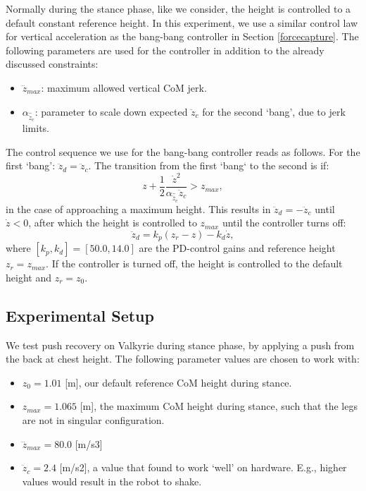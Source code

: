 \documentclass[letterpaper, 10 pt, conference]{ieeeconf}  %
\newcommand{\zmax}{z_{max}}
\newcommand{\rcmpd}{\mathbf{r}_{cop,d}}
\newcommand{\icpe}{\boldsymbol{\xi}_e}
\begin{document}
Normally during the stance phase, like we consider, the height is controlled to a default constant reference height. In this experiment, we use a similar control law for vertical acceleration as the bang-bang controller in Section \ref{forcecapture}. The following parameters are used for the controller in addition to the already discussed constraints:
\begin{itemize}
	\item $\dddot{z}_{max}$: maximum allowed vertical CoM jerk.
	\item $\alpha_{\hat{\ddot{z}}_{c}}$: parameter to scale down expected $\ddot{z}_c$ for the second `bang', due to jerk limits.
\end{itemize}

The control sequence we use for the bang-bang controller reads as follows. For the first `bang': $\ddot{z}_d=\ddot{z}_c$. The transition from the first `bang` to the second is if:
\begin{equation}
	z+\frac{1}{2}\frac{\dot{z}^2}{\alpha_{\hat{\ddot{z}}_{c}}\ddot{z}_{c}} >\zmax,
\end{equation}
in the case of approaching a maximum height. This results in $\ddot{z}_d=-\ddot{z}_c$ until $\dot{z}<0$, after which the height is controlled to $\zmax$ until the controller turns off:
\begin{equation}
	\ddot{z}_d = k_p(z_r-z)-k_d\dot{z},
\end{equation}
where $[k_p,k_d]=[50.0,14.0]$ are the PD-control gains and reference height $z_r= \zmax$. If the controller is turned off, the height is controlled to the default height and $z_r=z_0$.
\subsection{Experimental Setup}
We test push recovery on Valkyrie during stance phase, by applying a push from the back at chest height. The following parameter values are chosen to work with:
\begin{itemize}
\item $z_0=1.01$ [m], our default reference CoM height during stance.
\item $\zmax=1.065$ [m], the maximum CoM height during stance, such that the legs are not in singular configuration.
\item $\dddot{z}_{max} = 80.0$ [m/s3]
\item $\ddot{z}_c=2.4$ [m/s2], a value that found to work `well' on hardware. E.g., higher values would result in the robot to shake.
\end{itemize}
\end{document}

